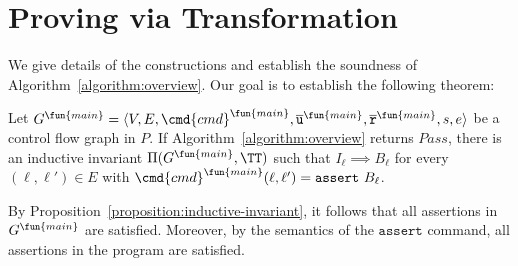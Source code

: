 
\chapter{Proving via Transformation}
\label{ch:proving-via-transformation}

We give details of the constructions and establish the soundness of
Algorithm~\ref{algorithm:overview}. Our goal is to establish the
following theorem:

\begin{theorem}
  Let $G^\fun{main} = \langle V, E, \cmd{cmd}^\fun{main} , \overline{\mathtt{u}}^\fun{main}, \overline{\mathtt{r}}^\fun{main},s,e \rangle$ be a control flow
  graph in $P$. If Algorithm~\ref{algorithm:overview} returns
  $\mathit{Pass}$, there is an inductive invariant $\Pi (G^\fun{main}, \TT)$
  such that $I_{\ell} \implies B_{\ell}$ for every $(\ell, \ell') \in
  E$ with $\cmd{cmd}^\fun{main} (\ell, \ell') = \mathtt{assert\ } B_{\ell}$.
  \label{theorem:soundness}
\end{theorem}
By Proposition~\ref{proposition:inductive-invariant}, it follows that
all assertions in $G^\fun{main}$ are satisfied.
Moreover, by the semantics of the 
$\mathtt{assert}$ command, all assertions in the program are satisfied.






